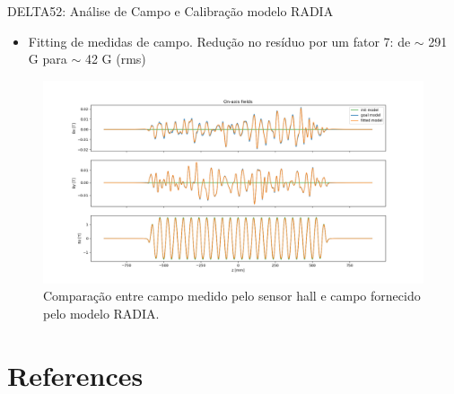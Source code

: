 \documentclass{beamer}					%
\begin{document}
\begin{frame}{DELTA52: Análise de Campo e Calibração modelo RADIA}
\begin{itemize}
        \item Fitting de medidas de campo. Redução no resíduo por um fator 7: de $\sim$ 291 G para $\sim$ 42 G (rms)
	\end{itemize}
\begin{figure}[H]
		\centering
        \includegraphics[width=.9\textwidth]{figures/field_fitting.png}
        \caption{Comparação entre campo medido pelo sensor hall e campo fornecido pelo modelo RADIA.}
        \label{fig:field_fitting}
    \end{figure}
\end{frame}


\section{References}

% 	
\end{document}
